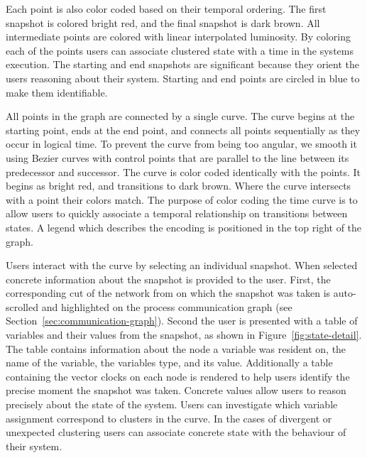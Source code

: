 Each point is also
color coded based on their temporal ordering. The first snapshot is
colored bright red, and the final snapshot is dark brown. All
intermediate points are colored with linear interpolated luminosity. 
By coloring
each of the points users can associate clustered state with a time in
the systems execution. The starting and end snapshots are significant
because they orient the users reasoning about their system. Starting
and end points are circled in blue to make them identifiable.

All points in the graph are connected by a single curve. The curve
begins at the starting point, ends at the end point, and connects all
points sequentially as they occur in logical time. 
To prevent the curve from being too angular, we smooth it using Bezier
curves with control points that are parallel to the line between its
predecessor and successor.
The curve is color
coded identically with the points. It begins as bright red, and
transitions to dark brown. Where the curve intersects with a point
their colors match. The purpose of color coding the time curve is to
allow users to quickly associate a temporal relationship on
transitions between states. A legend which describes the encoding
is positioned in the top right of the graph.

Users interact with the curve by selecting an individual snapshot.
When selected concrete information about the snapshot is provided to
the user. First, the corresponding cut of the network from on which
the snapshot was taken is auto-scrolled and highlighted on the 
process communication
graph (see Section~\ref{sec:communication-graph}). Second the user is
presented with a table of variables and their values from the
snapshot, as shown in Figure~\ref{fig:state-detail}. 
The table contains information about the node a variable was
resident on, the name of the variable, the variables type, and its
value. Additionally a table containing the vector clocks on each node
is rendered to help users identify the precise moment the snapshot was
taken. Concrete values allow users to reason precisely about the state
of the system. Users can investigate which variable assignment
correspond to clusters in the curve. In the cases of divergent or
unexpected clustering users can associate concrete state with the
behaviour of their system.

